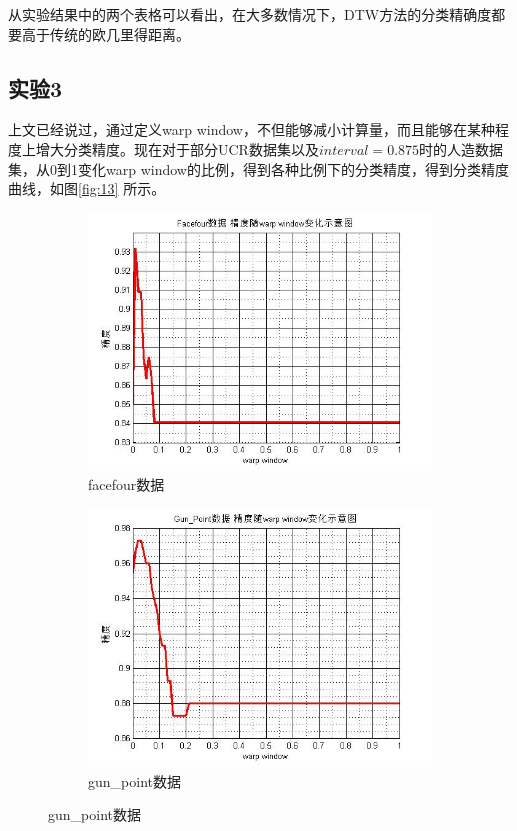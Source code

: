 从实验结果中的两个表格可以看出，在大多数情况下，DTW方法的分类精确度都要高于传统的欧几里得距离。

\subsection{实验3}
上文已经说过，通过定义warp window，不但能够减小计算量，而且能够在某种程度上增大分类精度。现在对于部分UCR数据集以及$interval = 0.875$时的人造数据集，从0到1变化warp window的比例，得到各种比例下的分类精度，得到分类精度曲线，如图\ref{fig:13} 所示。
\begin{figure}[h] \centering
    \begin{subfigure}[h]{0.4\linewidth}
        \includegraphics[width=\linewidth]{./figure/facefour.jpg}
        \caption{facefour数据} \label{fig:subfigure:1}
    \end{subfigure} %
    \quad
    \begin{subfigure}[h]{0.4\linewidth}
        \includegraphics[width=\linewidth]{./figure/gun_point.jpg}
        \caption{gun\_point数据} \label{fig:subfigure:2}
    \end{subfigure}


\end{figure}
